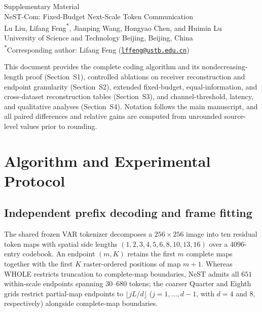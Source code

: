 \documentclass[10pt,letterpaper]{article}
\begin{document}
\begin{center}
{\Large Supplementary Material}\\[4pt]
{\large NeST-Com: Fixed-Budget Next-Scale Token Communication}\\[6pt]
{\normalsize Lu Liu, Lifang Feng\textsuperscript{*}, Jianping Wang, Hongyao Chen, and Huimin Lu}\\[2pt]
{\small University of Science and Technology Beijing, Beijing, China}\\
{\small \textsuperscript{*}Corresponding author: Lifang Feng (\href{mailto:lffeng@ustb.edu.cn}{\nolinkurl{lffeng@ustb.edu.cn}})}
\end{center}

\vspace{4pt}
\noindent This document provides the complete coding algorithm and its nondecreasing-length proof (Section~S1), controlled ablations on receiver reconstruction and endpoint granularity (Section~S2), extended fixed-budget, equal-information, and cross-dataset reconstruction tables (Section~S3), and channel-threshold, latency, and qualitative analyses (Section~S4). Notation follows the main manuscript, and all paired differences and relative gains are computed from unrounded source-level values prior to rounding.

\section{Algorithm and Experimental Protocol}

\subsection{Independent prefix decoding and frame fitting}
The shared frozen VAR tokenizer decomposes a $256\times 256$ image into ten residual token maps with spatial side lengths $(1,2,3,4,5,6,8,10,13,16)$ over a $4096$-entry codebook. An endpoint $(m,K)$ retains the first $m$ complete maps together with the first $K$ raster-ordered positions of map $m+1$. Whereas WHOLE restricts truncation to complete-map boundaries, NeST admits all $651$ within-scale endpoints spanning $30$--$680$ tokens; the coarser Quarter and Eighth grids restrict partial-map endpoints to $\lfloor jL/d\rfloor$ ($j=1,\ldots,d-1$, with $d=4$ and $8$, respectively) alongside complete-map boundaries.
\end{document}
